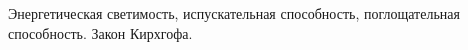 \documentclass[__main__.tex]{subfiles}
\begin{document}
Энергетическая светимость, испускательная способность, поглощательная способность. Закон Кирхгофа.\\ 

\end{document}
